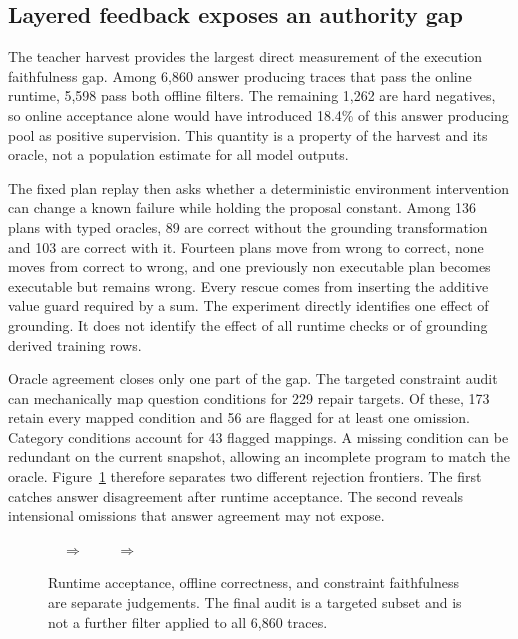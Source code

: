 \documentclass{article}
\begin{document}
\subsection{Layered feedback exposes an authority gap}

The teacher harvest provides the largest direct measurement of the execution faithfulness gap.
Among 6,860 answer producing traces that pass the online runtime, 5,598 pass both offline filters.
The remaining 1,262 are hard negatives, so online acceptance alone would have introduced 18.4\%
of this answer producing pool as positive supervision.  This quantity is a property of the harvest
and its oracle, not a population estimate for all model outputs.

The fixed plan replay then asks whether a deterministic environment intervention can change a known
failure while holding the proposal constant.  Among 136 plans with typed oracles, 89 are correct
without the grounding transformation and 103 are correct with it.  Fourteen plans move from wrong
to correct, none moves from correct to wrong, and one previously non executable plan becomes
executable but remains wrong.  Every rescue comes from inserting the additive value guard required
by a sum.  The experiment directly identifies one effect of grounding.  It does not identify the
effect of all runtime checks or of grounding derived training rows.

Oracle agreement closes only one part of the gap.  The targeted constraint audit can mechanically
map question conditions for 229 repair targets.  Of these, 173 retain every mapped condition and 56
are flagged for at least one omission.  Category conditions account for 43 flagged mappings.  A
missing condition can be redundant on the current snapshot, allowing an incomplete program to
match the oracle.  Figure~\ref{fig:authority-gap} therefore separates two different rejection
frontiers.  The first catches answer disagreement after runtime acceptance.  The second reveals
intensional omissions that answer agreement may not expose.

\begin{figure}[t]
\centering
\setlength{\fboxsep}{6pt}
$\quad\Longrightarrow\quad$
$\quad\Longrightarrow\quad$
\caption{Runtime acceptance, offline correctness, and constraint faithfulness are separate
judgements.  The final audit is a targeted subset and is not a further filter applied to all 6,860
traces.}
\label{fig:authority-gap}
\end{figure}
\end{document}
